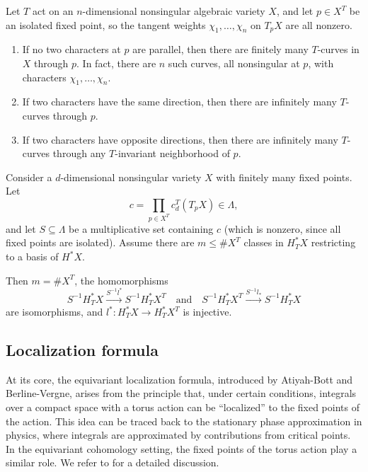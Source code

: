 \begin{proposition}
	Let \( T \) act on an \( n \)-dimensional nonsingular algebraic variety \( X \), and let \( p \in X^T \) be an isolated fixed point, so the tangent weights \( \chi_1, \dots, \chi_n \) on \( T_p X \) are all nonzero.
	\begin{enumerate}
		\item If no two characters at \( p \) are parallel, then there are finitely many \( T \)-curves in \( X \) through \( p \). In fact, there are \( n \) such curves, all nonsingular at \( p \), with characters \( \chi_1, \dots, \chi_n \).
		\item If two characters have the same direction, then there are infinitely many \( T \)-curves through \( p \).
		\item If two characters have opposite directions, then there are infinitely many \( T \)-curves through any \( T \)-invariant neighborhood of \( p \).
	\end{enumerate}
\end{proposition}

\begin{theorem}
	Consider a $d$-dimensional nonsingular variety $X$ with finitely many fixed points. Let
	\[
		c = \prod_{p \in X^T} c_d^T(T_p X) \in \Lambda,
	\]
	and let $S \subseteq \Lambda$ be a multiplicative set containing $c$ (which is nonzero, since all fixed points are isolated). Assume there are $m \leq \#X^T$ classes in $H^*_T X$ restricting to a basis of $H^* X$.

	Then $m = \#X^T$, the homomorphisms
	\[
		S^{-1} H^*_T X \xrightarrow{S^{-1} l^*} S^{-1} H^*_T X^T \quad \text{and} \quad S^{-1} H^*_T X^T \xrightarrow{S^{-1} l_*} S^{-1} H^*_T X
	\]
	are isomorphisms, and $l^*: H^*_T X \to H^*_T X^T$ is injective.
\end{theorem}

\subsection{Localization formula}
At its core, the equivariant localization formula, introduced by Atiyah-Bott and Berline-Vergne, arises from the principle that, under certain conditions, integrals over a compact space with a torus action can be “localized” to the fixed points of the action. This idea can be traced back to the stationary phase approximation in physics, where integrals are approximated by contributions from critical points. In the equivariant cohomology setting, the fixed points of the torus action play a similar role. We refer to \cite{fulton-anderson} for a detailed discussion.

